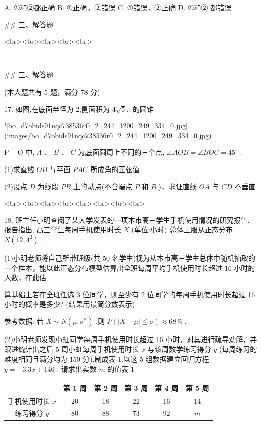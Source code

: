 \documentclass[11pt,a4paper]{article}
\renewcommand{\leq}{\leqslant}
\begin{document}
A. ①和②都正确 B. ①正确，②错误 C. ①错误，②正确 D. ①和② 都错误

## 三、解答题




<br><br><br><br><br>


---

## 三、解答题

(本大题共有 5 题，满分 78 分)


17. 如图,在底面半径为 2,侧面积为 $4\sqrt{5}\pi$ 的圆锥

![bo_d7obids91nqc738536r0_2_244_1200_249_334_0.jpg](images/bo_d7obids91nqc738536r0_2_244_1200_249_334_0.jpg)

$\mathrm{P} - \mathrm{O}$ 中, $A\text{ 、 }B\text{ 、 }C$ 为底面圆周上不同的三个点, $\angle {AOB} = \angle {BOC} = {45}^{ \circ  }$ .

(1)求直线 ${OB}$ 与平面 ${PAC}$ 所成角的正弦值

(2)设点 $D$ 为线段 ${PB}$ 上的动点(不含端点 $P$ 和 $B$ )，求证直线 ${OA}$ 与 ${CD}$ 不垂直


<br><br><br><br><br><br><br><br>


18. 班主任小明查阅了某大学发表的一项本市高三学生手机使用情况的研究报告. 报告指出, 高三学生每周手机使用时长 $X$ (单位:小时) 总体上服从正态分布 $N\left( {{12},{4}^{2}}\right)$ .

(1)小明老师将自己所带班级(共 50 名学生)视为从本市高三学生总体中随机抽取的一个样本，能以此正态分布模型估算出全班每周平均手机使用时长超过 16 小时的人数，在此估

算基础上若在全班任选 3 位同学，则至少有 2 位同学的每周手机使用时长超过 16 小时的概率是多少? (结果用最简分数表示)

参考数据: 若 $X \sim  N\left( {\mu ,{\sigma }^{2}}\right)$ ,则 $P\left( {\left| {X - \mu }\right|  \leq  \sigma }\right)  \approx  {68}\%$ .

(2)小明老师发现小虹同学每周手机使用时长超过 16 小时，对其进行疏导劝解，并跟进统计出之后 5 周小虹每周手机使用时长 $x$ 与该周数学练习得分 $y$ (每周练习的难度相同且满分均为 150 分),制成表 1.以这 5 组数据建立回归方程 $y =  - {3.3x} + {146}$ . 请求出实数 $m$ 的值表 1

\begin{tabular}{|c|c|c|c|c|c|}
\hline
 & 第 1 周 & 第 2 周 & 第 3 周 & 第 4 周 & 第 5 周 \\ \hline
手机使用时长 $x$ & 20 & 18 & 22 & 16 & 14 \\ \hline
练习得分 $y$ & 80 & 88 & 73 & 92 & $m$ \\ \hline
\end{tabular}
\end{document}
